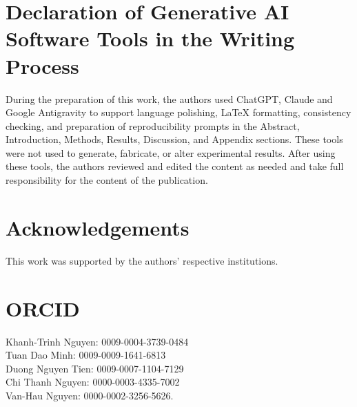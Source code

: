 \documentclass[12pt,a4paper]{jedm}
\begin{document}
\section*{Declaration of Generative AI Software Tools in the Writing Process}
During the preparation of this work, the authors used ChatGPT, Claude and Google Antigravity to support language polishing, LaTeX formatting, consistency checking, and preparation of reproducibility prompts in the Abstract, Introduction, Methods, Results, Discussion, and Appendix sections. These tools were not used to generate, fabricate, or alter experimental results. After using these tools, the authors reviewed and edited the content as needed and take full responsibility for the content of the publication.

\section*{Acknowledgements}
This work was supported by the authors' respective institutions.

\section*{ORCID}
\noindent Khanh-Trinh Nguyen: 0009-0004-3739-0484\\
\noindent Tuan Dao Minh: 0009-0009-1641-6813\\
\noindent Duong Nguyen Tien: 0009-0007-1104-7129\\
\noindent Chi Thanh Nguyen: 0000-0003-4335-7002\\
\noindent Van-Hau Nguyen: 0000-0002-3256-5626.



% 
\end{document}
